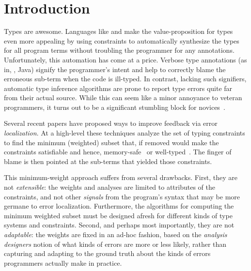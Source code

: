 \section{Introduction}
\label{sec:introduction}

%
Types are awesome.
%
Languages like \ocaml and \haskell make
the value-proposition for types even more
appealing by using constraints to automatically
synthesize the types for all program terms
without troubling the programmer for any
annotations.
%
Unfortunately, this automation has come at a price.
Verbose type annotations (as in, \eg, Java) signify
the programmer's intent and help to correctly
blame the erroneous sub-term when the code is
ill-typed.
%
In contrast, lacking such signifiers, automatic
type inference algorithms are prone to report
type errors quite far from their actual source.
%
While this can seem like a minor annoyance to
veteran programmers, it turns out to be a significant
stumbling block for novices~\citep{Wand1986-nw,Joosten1993-yx}.

%
Several recent papers have proposed ways
to improve feedback via error \emph{localization}.
%
At a high-level these techniques analyze
the set of typing constraints to find
the minimum (weighted) subset that,
if removed would make the constraints
satisfiable and hence, memory-safe~\citep{Jose:2011}
or well-typed~\citep{Zhang2014-lv,Loncaric2016-uk,Chen2014-vm,Pavlinovic2014-mr}.
The finger of blame is then pointed at the
sub-terms that yielded those constraints.

This minimum-weight approach suffers
from several drawbacks.
%
First, they are not \emph{extensible}:
the weights and analyses are limited
to attributes of the constraints, and
not other \emph{signals} from the
program's syntax that may be more
germane to error localization. Furthermore,
the algorithms for computing
the minimum weighted subset must be
designed afresh for different kinds
of type systems and constraints.
%
Second, and perhaps most importantly,
they are not \emph{adaptable}: the
weights are fixed in an ad-hoc fashion, based on the
\emph{analysis designers} notion
of what kinds of errors are more
or less likely, rather than
capturing and adapting to the
ground truth about the kinds
of errors programmers actually
make in practice.

